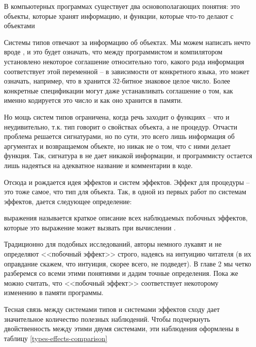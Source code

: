 \bigskip

В компьютерных программах существует два основополагающих понятия: это объекты, которые хранят информацию, и функции, которые что-то делают с объектами

Системы типов отвечают за информацию об объектах. Мы можем написать нечто вроде , и это будет означать, что между программистом и компилятором установлено некоторое соглашение относительно того, какого рода информация соответствует этой переменной -- в зависимости от конкретного языка, это может означать, например, что в  хранится 32-битное знаковое целое число. Более конкретные спецификации могут даже устанавливать соглашение о том, как именно кодируется это число и как оно хранится в памяти.

Но мощь систем типов ограничена, когда речь заходит о функциях -- что и неудивительно, т.к. тип говорит о свойствах объекта, а не процедур. Отчасти проблема решается сигнатурами, но по сути, это всего лишь информация об аргументах и возвращаемом объекте, но никак не о том, что с ними делает функция. Так, сигнатура  в  не дает никакой информации, и программисту остается лишь надеяться на адекватное название и комментарии в коде.

Отсюда и рождается идея эффектов и систем эффектов. Эффект для процедуры -- это тоже самое, что тип для объекта. Так, в одной из первых работ по системам эффектов, дается следующее определение:

\begin{definition}
	 выражения называется краткое описание всех наблюдаемых побочных эффектов, которые это выражение может вызвать при вычислении \cite{Luc88}.
	\label{def-effect}
\end{definition}

Традиционно для подобных исследований, авторы немного лукавят и не определяют <<побочный эффект>> строго, надеясь на интуицию читателя (в их оправдание скажем, что интуиция, скорее всего, не подведет). В главе 2 мы четко разберемся со всеми этими понятиями и дадим точные определения. Пока же можно считать, что <<побочный эффект>> соответствует некоторому изменению в памяти программы.


Тесная связь между системами типов и системами эффектов сходу дает значительное количество полезных наблюдений. Чтобы подчеркнуть двойственность между этими двумя системами, эти наблюдения оформлены в таблицу \ref{types-effects-comparison}

